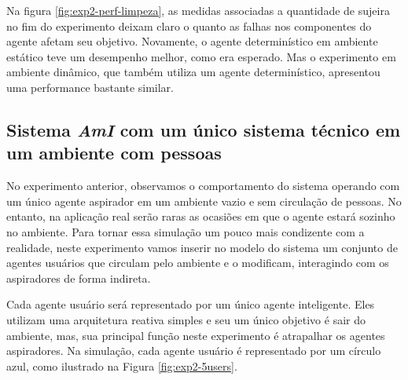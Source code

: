 \begin{figure}[h!]
    \centering
\end{figure}

Na figura \ref{fig:exp2-perf-limpeza}, as medidas associadas a quantidade de sujeira no fim do experimento deixam claro o quanto as falhas nos componentes do agente afetam seu objetivo. Novamente, o agente determinístico em ambiente estático teve um desempenho melhor, como era esperado. Mas o experimento em ambiente dinâmico, que também utiliza um agente determinístico, apresentou uma performance bastante similar. 

\subsection{Sistema \textit{AmI} com um único sistema técnico em um ambiente com pessoas}
\label{sec:exp-user}
No experimento anterior, observamos o comportamento do sistema operando com um único agente aspirador em um ambiente vazio e sem circulação de pessoas. No entanto, na aplicação real serão raras as ocasiões em que o agente estará sozinho no ambiente. Para tornar essa simulação um pouco mais condizente com a realidade, neste experimento vamos inserir no modelo do sistema um conjunto de agentes usuários que circulam pelo ambiente e o modificam, interagindo com os aspiradores de forma indireta.

Cada agente usuário será representado por um único agente inteligente. Eles utilizam uma arquitetura reativa simples e seu um único objetivo é sair do ambiente, mas, sua principal função neste experimento é atrapalhar os agentes aspiradores. Na simulação, cada agente usuário é representado por um círculo azul, como ilustrado na Figura \ref{fig:exp2-5users}. 

